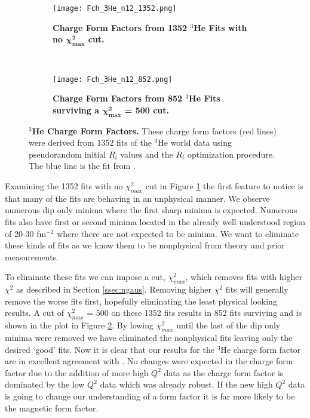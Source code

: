 \begin{figure}[!ht]
\begin{subfigure}{1.\textwidth}
  \centering
  \texttt{[image: Fch\_3He\_n12\_1352.png]}
  \caption{\bf{Charge Form Factors from 1352 $^3$He Fits with no $\boldsymbol{\chi^2_{max}}$ cut.}}
  \label{fig:3he_fch_no_cut}
\end{subfigure}\\
\begin{subfigure}{1.\textwidth}
  \centering
  \texttt{[image: Fch\_3He\_n12\_852.png]}
  \caption{\bf{Charge Form Factors from 852 $^3$He Fits surviving a $\boldsymbol{\chi^2_{max}}$ = 500 cut.}}
  \label{fig:3he_fch_cut}
\end{subfigure}
\caption[$^3$He Charge Form Factors] {
{\bf{$^3$He Charge Form Factors.}} These charge form factors (red lines) were derived from 1352 fits of the $^3$He world data using pseudorandom initial $R_i$ values and the $R_i$ optimization procedure. The blue line is the fit from \cite{Article:Amroun}.}
\label{fig:3he_fch}
\end{figure}

Examining the 1352 fits with no $\chi^2_{max}$ cut in Figure \ref{fig:3he_fch_no_cut} the first feature to notice is that many of the fits are behaving in an unphysical manner. We observe numerous dip only minima where the first sharp minima is expected. Numerous fits also have first or second minima located in the already well understood region of 20-30 fm$^{-2}$ where there are not expected to be minima. We want to eliminate these kinds of fits as we know them to be nonphysical from theory and prior measurements. 

To eliminate these fits we can impose a cut, $\chi^2_{max}$, which removes fits with higher $\chi^2$ as described in Section \ref{ssec:ngaus}. Removing higher $\chi^2$ fits will generally remove the worse fits first, hopefully eliminating the least physical looking results. A cut of $\chi^2_{max}$ = 500 on these 1352 fits results in 852 fits surviving and is shown in the plot in Figure \ref{fig:3he_fch_cut}. By lowing $\chi^2_{max}$ until the last of the dip only minima were removed we have eliminated the nonphysical fits leaving only the desired `good' fits. Now it is clear that our results for the $^3$He charge form factor are in excellent agreement with \cite{Article:Amroun}. No changes were expected in the charge form factor due to the addition of more high $Q^2$ data as the charge form factor is dominated by the low $Q^2$ data which was already robust. If the new high $Q^2$ data is going to change our understanding of a form factor it is far more likely to be the magnetic form factor.

